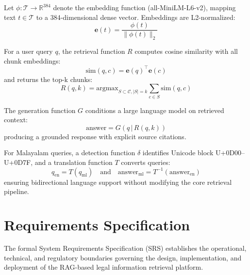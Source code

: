 \documentclass[12pt,a4paper]{report}
\begin{document}
Let $\phi: \mathcal{T} \to \mathbb{R}^{384}$ denote the embedding function (all-MiniLM-L6-v2), mapping text $t \in \mathcal{T}$ to a 384-dimensional dense vector. Embeddings are L2-normalized:
\begin{equation}
    \mathbf{e}(t) = \frac{\phi(t)}{\|\phi(t)\|_2}
\end{equation}

For a user query $q$, the retrieval function $R$ computes cosine similarity with all chunk embeddings:
\begin{equation}
    \text{sim}(q, c) = \mathbf{e}(q)^\top \mathbf{e}(c)
\end{equation}
and returns the top-k chunks:
\begin{equation}
    R(q, k) = \text{argmax}_{S \subset \mathcal{C}, |S|=k} \sum_{c \in S} \text{sim}(q, c)
\end{equation}

The generation function $G$ conditions a large language model on retrieved context:
\begin{equation}
    \text{answer} = G(q \,|\, R(q, k))
\end{equation}
producing a grounded response with explicit source citations.

For Malayalam queries, a detection function $\delta$ identifies Unicode block U+0D00–U+0D7F, and a translation function $T$ converts queries:
\begin{equation}
    q_{\text{en}} = T(q_{\text{ml}}) \quad \text{and} \quad \text{answer}_{\text{ml}} = T^{-1}(\text{answer}_{\text{en}})
\end{equation}
ensuring bidirectional language support without modifying the core retrieval pipeline.


\chapter{Requirements Specification}

The formal System Requirements Specification (SRS) establishes the operational, technical, and regulatory boundaries governing the design, implementation, and deployment of the RAG-based legal information retrieval platform.
\end{document}
